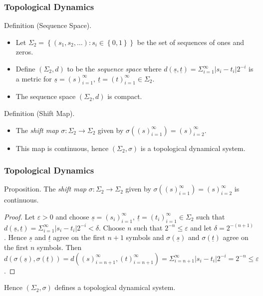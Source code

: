 \documentclass{beamer}
\begin{document}
\begin{frame}
    \frametitle{Topological Dynamics}
    \begin{block}{Definition (Sequence Space).}
        \begin{itemize}
            \item Let $\Sigma_2 = \left\lbrace (s_1, s_2, \dots): s_i \in \left\lbrace 0, 1 \right\rbrace \right\rbrace$ be the set of sequences of ones and zeros.
            \item Define $(\Sigma_2, d)$ to be the \emph{sequence space} where $d(\underline{s}, \underline{t}) = \Sigma_{i=1}^{\infty}|s_i - t_i|2^{-i}$ is a metric for $\underline{s} = (s)_{i=1}^{\infty}, \ \underline{t} = (t)_{i=1}^{\infty}  \in \Sigma_2$.
            \item The sequence space $(\Sigma_2, d)$ is compact.
        \end{itemize}
    \end{block}
    \begin{block}{Definition (Shift Map).}
        \begin{itemize}
            \item The \emph{shift map} $\sigma: \Sigma_2 \to \Sigma_2$ given by $\sigma \left((s)_{i=1}^{\infty}\right) = (s)_{i=2}^{\infty}$.
            \item This map is continuous, hence $(\Sigma_2, \sigma)$ is a topological dynamical system.
        \end{itemize}
    \end{block}
\end{frame}

\begin{frame}
    \frametitle{Topological Dynamics}
    \begin{block}{Proposition.}
        The \emph{shift map} $\sigma: \Sigma_2 \to \Sigma_2$ given by $\sigma \left((s)_{i=1}^{\infty}\right) = (s)_{i=2}^{\infty}$ is continuous.
        \begin{proof}
            Let $\varepsilon > 0$ and choose $\underline{s} = (s_i)_{i=1}^{\infty}, \ \underline{t} = (t_i)_{i=1}^{\infty} \in \Sigma_2$ such that $d(\underline{s}, \underline{t}) = \Sigma_{i=1}^{\infty}|s_i - t_i|2^{-i} < \delta$. Choose $n$ such that $2^{-n} \leq \varepsilon$ and let $\delta = 2^{-(n+1)}$. Hence $\underline{s}$ and $\underline{t}$ agree on the first $n+1$ symbols and $\sigma\left(\underline{s}\right)$ and $\sigma\left(\underline{t}\right)$ agree on the first $n$ symbols. Then $d\left( \sigma\left(\underline{s}\right), \sigma\left(\underline{t}\right) \right) = d\left((s)_{i=n+1}^{\infty}, (t)_{i=n+1}^{\infty}\right) = \Sigma_{i=n+1}^{\infty}|s_i - t_i|2^{-i} = 2^{-n} \leq \varepsilon$.
        \end{proof}
    \end{block}
    \vspace{0.5cm}
    Hence $(\Sigma_2, \sigma)$ defines a topological dynamical system.
\end{frame}
\end{document}
